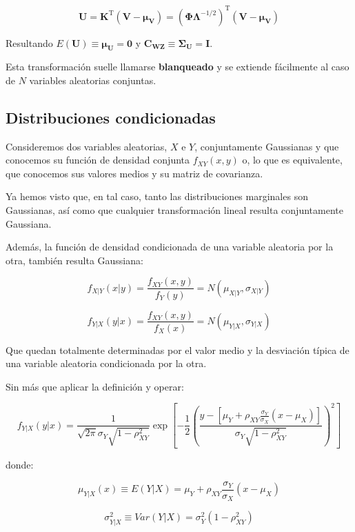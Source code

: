 \documentclass[11pt]{article}
\begin{document}
\[
\mathbf{U} = \mathbf{K}^\mathrm{T}(\mathbf{V}-\boldsymbol{\mu_V}) =
\left(\boldsymbol{\Phi}\boldsymbol{\Lambda}^{-1/2} \right)^\mathrm{T}(\mathbf{V}-\boldsymbol{\mu_V})
\]

Resultando \(E(\mathbf{U}) \equiv \boldsymbol{\mu_U} = \mathbf{0}\) y
\(\mathbf{C_{WZ}}\equiv \boldsymbol{\Sigma_U} = \mathbf{I}\).

Esta transformación suelle llamarse \textbf{blanqueado} y se extiende
fácilmente al caso de \(N\) variables aleatorias conjuntas.

    \hypertarget{distribuciones-condicionadas}{%
\subsection{Distribuciones
condicionadas}\label{distribuciones-condicionadas}}

Consideremos dos variables aleatorias, \(X\) e \(Y\), conjuntamente
Gaussianas y que conocemos su función de densidad conjunta
\(f_{XY}(x,y)\) o, lo que es equivalente, que conocemos sus valores
medios y su matriz de covarianza.

Ya hemos visto que, en tal caso, tanto las distribuciones marginales son
Gaussianas, así como que cualquier transformación lineal resulta
conjuntamente Gaussiana.

Además, la función de densidad condicionada de una variable aleatoria
por la otra, también resulta Gaussiana:

\[f_{X | Y}(x | y)=\frac{f_{XY}(x,y)}{f_Y(y)} = N(\mu_{X|Y}, \sigma_{X|Y})\]

\[f_{Y | X}(y | x)=\frac{f_{XY}(x,y)}{f_X(x)} = N(\mu_{Y|X}, \sigma_{Y|X})\]

Que quedan totalmente determinadas por el valor medio y la desviación
típica de una variable aleatoria condicionada por la otra.

    Sin más que aplicar la definición y operar:

\[
f_{Y | X}(y | x)=
\frac{1}{\sqrt{2 \pi} \sigma_{Y} \sqrt{1-\rho_{XY}^{2}}} \exp \left[-\frac{1}{2}\left(\frac{y-\left[\mu_{Y}+\rho_{XY} \frac{\sigma_{Y}}{\sigma_{X}}\left(x-\mu_{X}\right)\right]}{\sigma_{Y} \sqrt{1-\rho_{XY}^{2}}}\right)^{2}\right]
\]

donde:

\[
\mu_{Y | X}(x) \equiv E(Y | X) = \mu_{Y}+\rho_{XY} \frac{\sigma_{Y}}{\sigma_{X}}\left(x-\mu_{X}\right)
\]

\[
\sigma_{Y | X}^2 \equiv Var(Y | X) = \sigma_{Y}^2 (1-\rho_{XY}^{2})
\]
\end{document}
